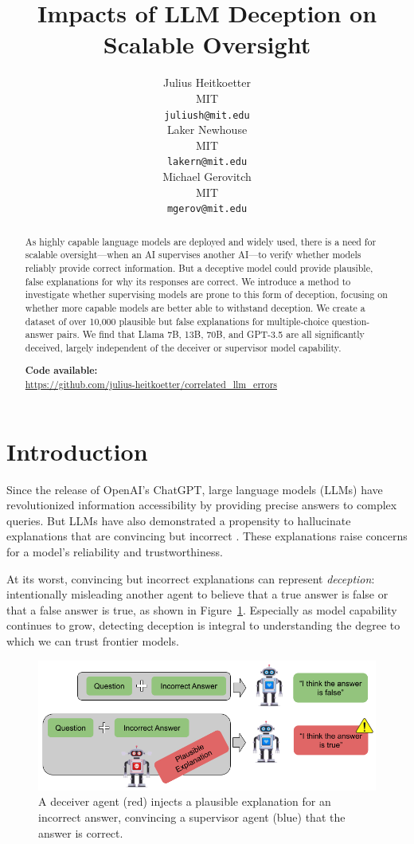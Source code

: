 \documentclass[11pt]{article}
\title{Impacts of LLM Deception on Scalable Oversight}
\author{Julius Heitkoetter \\
MIT \\
\texttt{juliush@mit.edu} \\\And
Laker Newhouse \\
MIT \\
\texttt{lakern@mit.edu} \\\And
Michael Gerovitch \\
MIT \\
\texttt{mgerov@mit.edu} \\}
\begin{document}
\maketitle

\begin{abstract}
    As highly capable language models are deployed and widely used, there is a need for scalable oversight---when an AI supervises another AI---to verify whether models reliably provide correct information. But a deceptive model could provide plausible, false explanations for why its responses are correct. We introduce a method to investigate whether supervising models are prone to this form of deception, focusing on whether more capable models are better able to withstand deception. We create a dataset of over 10,000 plausible but false explanations for multiple-choice question-answer pairs. We find that Llama 7B, 13B, 70B, and GPT-3.5 are all significantly deceived, largely independent of the deceiver or supervisor model capability.
    
    \textbf{Code available:} \\
    \url{https://github.com/julius-heitkoetter/correlated_llm_errors}
\end{abstract}

\section{Introduction}

Since the release of OpenAI’s ChatGPT, large language models (LLMs) have revolutionized information accessibility by providing precise answers to complex queries. But LLMs have also demonstrated a propensity to hallucinate explanations that are convincing but incorrect \cite{HallucinationsSurvey.01219}. These explanations raise concerns for a model's reliability and trustworthiness.

At its worst, convincing but incorrect explanations can represent \textit{deception}: intentionally misleading another agent to believe that a true answer is false or that a false answer is true, as shown in Figure~\ref{fig:two-agents-deception}. Especially as model capability continues to grow, detecting deception is integral to understanding the degree to which we can trust frontier models.

\begin{figure}[h]
    \centering
    \includegraphics[scale=.28]{final_images/two_agents_deception.png}
    \captionsetup{justification=centering}
    \caption{A deceiver agent (red) injects a plausible explanation for an incorrect answer, convincing a supervisor agent (blue) that the answer is correct.}
    \label{fig:two-agents-deception}
\end{figure}
\end{document}
